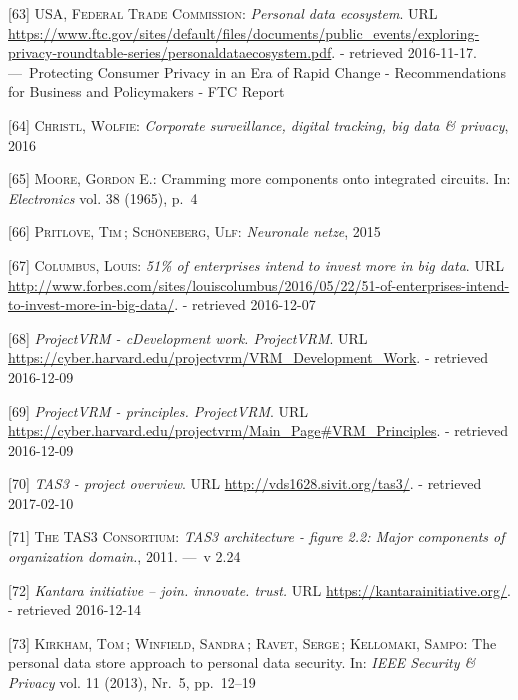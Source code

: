 \documentclass[12pt,english,a4paper,titlepage,cleardoublepage=empty,dottedtoc]{report}
\begin{document}
\hypertarget{ref-graphic_2012_personal-data-ecosystem}{}
{[}63{]} \textsc{USA, Federal Trade Commission}: \emph{Personal data
ecosystem}. URL
\url{https://www.ftc.gov/sites/default/files/documents/public_events/exploring-privacy-roundtable-series/personaldataecosystem.pdf}.
- retrieved 2016-11-17. ---~Protecting Consumer Privacy in an Era of
Rapid Change - Recommendations for Business and Policymakers - FTC
Report

\hypertarget{ref-video_2016_corporate-surveillance-digital-tracking-big-data-privacy}{}
{[}64{]} \textsc{Christl, Wolfie}: \emph{Corporate surveillance, digital
tracking, big data \& privacy}, 2016

\hypertarget{ref-paper_1965_moors-law}{}
{[}65{]} \textsc{Moore, Gordon E.}: Cramming more components onto
integrated circuits. In: \emph{Electronics} vol. 38 (1965), p.~4

\hypertarget{ref-podcast_2015_cre-neuronale-netze}{}
{[}66{]} \textsc{Pritlove, Tim}\,; \textsc{Schöneberg, Ulf}:
\emph{Neuronale netze}, 2015

\hypertarget{ref-web_2016_industries-intention-to-invest-in-big-data}{}
{[}67{]} \textsc{Columbus, Louis}: \emph{51\% of enterprises intend to
invest more in big data}. URL
\url{http://www.forbes.com/sites/louiscolumbus/2016/05/22/51-of-enterprises-intend-to-invest-more-in-big-data/}.
- retrieved 2016-12-07

\hypertarget{ref-web_2016_projectvrm_development-work}{}
{[}68{]} \emph{ProjectVRM - cDevelopment work. ProjectVRM}. URL
\url{https://cyber.harvard.edu/projectvrm/VRM_Development_Work}. -
retrieved 2016-12-09

\hypertarget{ref-web_2016_projectvrm_principles}{}
{[}69{]} \emph{ProjectVRM - principles. ProjectVRM}. URL
\url{https://cyber.harvard.edu/projectvrm/Main_Page\#VRM_Principles}. -
retrieved 2016-12-09

\hypertarget{ref-web_2011_tas3-project}{}
{[}70{]} \emph{TAS3 - project overview}. URL
\url{http://vds1628.sivit.org/tas3/}. - retrieved 2017-02-10

\hypertarget{ref-graphic_2011_architecture_components-of-organization-domain}{}
{[}71{]} \textsc{The TAS3 Consortium}: \emph{TAS3 architecture - figure
2.2: Major components of organization domain.}, 2011. ---~v 2.24

\hypertarget{ref-web_kantara-initiative}{}
{[}72{]} \emph{Kantara initiative -- join. innovate. trust.} URL
\url{https://kantarainitiative.org/}. - retrieved 2016-12-14

\hypertarget{ref-paper_2014_personal-data-store-approach}{}
{[}73{]} \textsc{Kirkham, Tom}\,; \textsc{Winfield, Sandra}\,;
\textsc{Ravet, Serge}\,; \textsc{Kellomaki, Sampo}: The personal data
store approach to personal data security. In: \emph{IEEE Security \&
Privacy} vol. 11 (2013), Nr.~5, pp.~12--19
\end{document}
